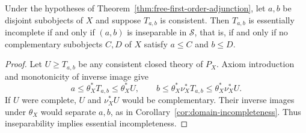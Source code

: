 \begin{corollary}\label{cor:signed-first-order-incompleteness}
Under the hypotheses of
Theorem~\ref{thm:free-first-order-adjunction}, let $a,b$ be
disjoint subobjects of $X$ and suppose $T_{a,b}$ is consistent.
Then $T_{a,b}$ is essentially incomplete if and only if $(a,b)$
is inseparable in $\mathscr S$, that is, if and only if no complementary
subobjects $C,D$ of $X$ satisfy $a\leq C$ and $b\leq D$.
\end{corollary}
\begin{proof}
Let $U\geq T_{a,b}$ be any consistent closed theory of $P_X$.
Axiom introduction and monotonicity of inverse image give
\[
 a\leq\theta_X^*T_{a,b}\leq\theta_X^*U,\qquad
 b\leq\theta_X^*\nu_X^*T_{a,b}\leq\theta_X^*\nu_X^*U .
\]
If $U$ were complete, $U$ and $\nu_X^*U$ would be complementary.
Their inverse images under $\theta_X$ would separate $a,b$, as in
Corollary~\ref{cor:domain-incompleteness}. Thus inseparability
implies essential incompleteness.


\end{proof}
